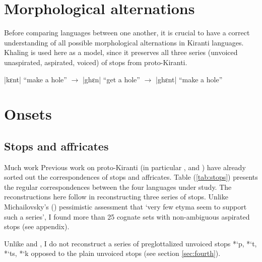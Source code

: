 \documentclass[oldfontcommands,oneside,a4paper,11pt]{article}
\newcommand{\ipa}[1]{{\phon \mbox{#1}}} %
\newcommand{\dhatu}[2]{|\ipa{#1}| ``#2''}
\begin{document}
\section{Morphological alternations} \label{sec:alternations}
Before comparing languages between one another, it is crucial to have a correct understanding of all possible morphological alternations in Kiranti languages. Khaling is used here as a model, since it preserves all three series (unvoiced unaspirated, aspirated, voiced) of stops from proto-Kiranti.


\citet{jacques15derivational.khaling}

\dhatu{kɛnt}{make a hole} $\rightarrow$  \dhatu{ghɛn}{get a hole} $\rightarrow$  \dhatu{ghɛnt}{make a hole}
\section{Onsets} \label{sec:onsets}

\subsection{Stops and affricates}
Much work 
Previous work on proto-Kiranti (in particular \citet{starostin94kiranti}, \citet{michailovsky94stops} and \citet{opgenort05jero}) have already sorted out the correspondences of stops and affricates. Table (\ref{tab:stops}) presents the regular correspondences between the four languages under study. The reconstructions here follow \citet{michailovsky94stops} in reconstructing three series of stops. Unlike Michailovsky's (\citeyear{michailovsky10kiranti}) pessimistic assessment that `very  few etyma seem to support such a series', I found more than 25 cognate sets with non-ambiguous aspirated stops (see appendix). 

Unlike \citet{starostin94kiranti} and \citet{opgenort05jero}, I do not reconstruct a series of preglottalized unvoiced stops *\ipa{`p},  *\ipa{`t},  *\ipa{`ts},  *\ipa{`k} opposed to the plain unvoiced stops (see section \ref{sec:fourth}). 
\end{document}
